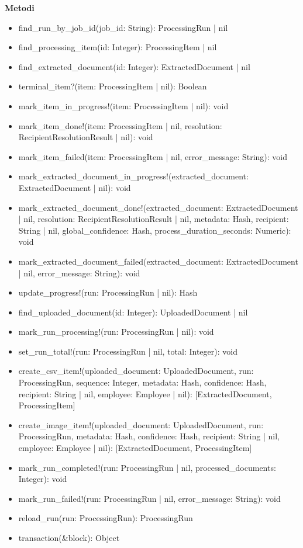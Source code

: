 \documentclass[a4paper,11pt]{article}
\begin{document}
\textbf{Metodi} 
\begin{itemize}
    \item find_run_by_job_id(job_id: String): ProcessingRun | nil
    \item find_processing_item(id: Integer): ProcessingItem | nil
    \item find_extracted_document(id: Integer): ExtractedDocument | nil
    \item terminal_item?(item: ProcessingItem | nil): Boolean
    \item mark_item_in_progress!(item: ProcessingItem | nil): void
    \item mark_item_done!(item: ProcessingItem | nil, resolution: RecipientResolutionResult | nil): void
    \item mark_item_failed(item: ProcessingItem | nil, error_message: String): void
    \item mark_extracted_document_in_progress!(extracted_document: ExtractedDocument | nil): void
    \item mark_extracted_document_done!(extracted_document: ExtractedDocument | nil, resolution: RecipientResolutionResult | nil, metadata: Hash, recipient: String | nil, global_confidence: Hash, process_duration_seconds: Numeric): void
    \item mark_extracted_document_failed(extracted_document: ExtractedDocument | nil, error_message: String): void
    \item update_progress!(run: ProcessingRun | nil): Hash
    \item find_uploaded_document(id: Integer): UploadedDocument | nil
    \item mark_run_processing!(run: ProcessingRun | nil): void
    \item set_run_total!(run: ProcessingRun | nil, total: Integer): void
    \item create_csv_item!(uploaded_document: UploadedDocument, run: ProcessingRun, sequence: Integer, metadata: Hash, confidence: Hash, recipient: String | nil, employee: Employee | nil): [ExtractedDocument, ProcessingItem]
    \item create_image_item!(uploaded_document: UploadedDocument, run: ProcessingRun, metadata: Hash, confidence: Hash, recipient: String | nil, employee: Employee | nil): [ExtractedDocument, ProcessingItem]
    \item mark_run_completed!(run: ProcessingRun | nil, processed_documents: Integer): void
    \item mark_run_failed!(run: ProcessingRun | nil, error_message: String): void
    \item reload_run(run: ProcessingRun): ProcessingRun
    \item transaction(\&block): Object
\end{itemize}
\end{document}
